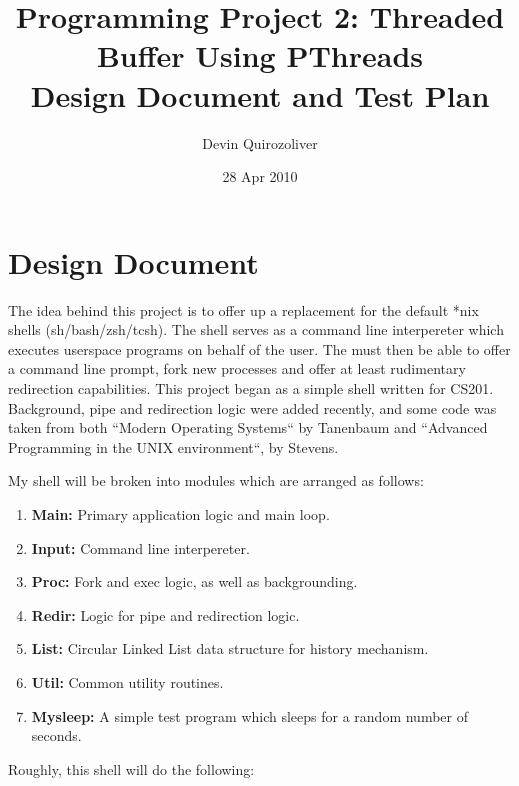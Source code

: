 \documentclass[letter,10pt]{article}
\author{Devin Quirozoliver}
\title{Programming Project 2: Threaded Buffer Using PThreads\\Design Document and Test Plan}
\date{28 Apr 2010}
\begin{document}
\maketitle

\section*{Design Document}

The idea behind this project is to offer up a replacement for the default *nix shells (sh/bash/zsh/tcsh). The shell serves as a command line interpereter which executes userspace programs on behalf of the user. The must then be able to offer a command line prompt, fork new processes and offer at least rudimentary redirection capabilities. This project began as a simple shell written for CS201. Background, pipe and redirection logic were added recently, and some code was taken from both ``Modern Operating Systems`` by Tanenbaum and ``Advanced Programming in the UNIX environment``, by Stevens.

My shell will be broken into modules which are arranged as follows:

\begin{enumerate}
    \item \textbf{Main:} Primary application logic and main loop.
    \item \textbf{Input:} Command line interpereter.
    \item \textbf{Proc:} Fork and exec logic, as well as backgrounding.
    \item \textbf{Redir:} Logic for pipe and redirection logic.
    \item \textbf{List:} Circular Linked List data structure for history mechanism.
    \item \textbf{Util:} Common utility routines.  \item \textbf{Mysleep:} A simple test program which sleeps for a random number of seconds.
\end{enumerate}

Roughly, this shell will do the following:
\end{document}
